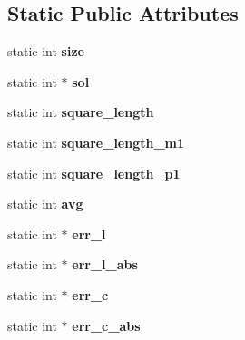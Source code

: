 \subsection*{Static Public Attributes}
\begin{DoxyCompactItemize}
\item 
\hypertarget{classMagicSquare_a526285b917194501dcf6656dc758926a}{
static int {\bfseries size}}
\label{classMagicSquare_a526285b917194501dcf6656dc758926a}

\item 
\hypertarget{classMagicSquare_a441c50e2d224b68c68b571ed6ca93506}{
static int $\ast$ {\bfseries sol}}
\label{classMagicSquare_a441c50e2d224b68c68b571ed6ca93506}

\item 
\hypertarget{classMagicSquare_a36cded7ec2d0e760cb344e413ff46218}{
static int {\bfseries square\_\-length}}
\label{classMagicSquare_a36cded7ec2d0e760cb344e413ff46218}

\item 
\hypertarget{classMagicSquare_a95a6a881885967a0c6b537eb91518729}{
static int {\bfseries square\_\-length\_\-m1}}
\label{classMagicSquare_a95a6a881885967a0c6b537eb91518729}

\item 
\hypertarget{classMagicSquare_acd21e15d520b34ba40e8f05b5cf6441d}{
static int {\bfseries square\_\-length\_\-p1}}
\label{classMagicSquare_acd21e15d520b34ba40e8f05b5cf6441d}

\item 
\hypertarget{classMagicSquare_a3b5958b6248adfca5b461fe1a39c038a}{
static int {\bfseries avg}}
\label{classMagicSquare_a3b5958b6248adfca5b461fe1a39c038a}

\item 
\hypertarget{classMagicSquare_aff35cc290ee4922a76489ab226c9d277}{
static int $\ast$ {\bfseries err\_\-l}}
\label{classMagicSquare_aff35cc290ee4922a76489ab226c9d277}

\item 
\hypertarget{classMagicSquare_ac849dbfa336a15280042b2fc2b372c79}{
static int $\ast$ {\bfseries err\_\-l\_\-abs}}
\label{classMagicSquare_ac849dbfa336a15280042b2fc2b372c79}

\item 
\hypertarget{classMagicSquare_ae3e52bf4e80df44fae1e301d6947ebd2}{
static int $\ast$ {\bfseries err\_\-c}}
\label{classMagicSquare_ae3e52bf4e80df44fae1e301d6947ebd2}

\item 
\hypertarget{classMagicSquare_a726c7a2306ae032767979c9fc66a07c0}{
static int $\ast$ {\bfseries err\_\-c\_\-abs}}
\label{classMagicSquare_a726c7a2306ae032767979c9fc66a07c0}


\end{DoxyCompactItemize}
